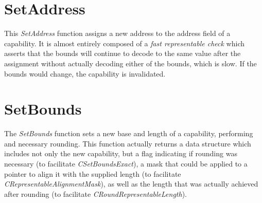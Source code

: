 

\section{SetAddress}
\label{sec:cheri-128-listings-setaddress}

This \emph{SetAddress} function assigns a new address to the address field
of a capability.
It is almost entirely composed of a \emph{fast representable check} which asserts
that the bounds will continue to decode to the same value after the assignment
without actually decoding either of the bounds, which is slow.
If the bounds would change, the capability is invalidated.



\section{SetBounds}
\label{sec:cheri-128-listings-setbounds}

The \emph{SetBounds} function sets a new base and length of a capability, performing
and necessary rounding.
This function actually returns a data structure which includes not only the new capability,
but a flag indicating if rounding was necessary (to facilitate \emph{CSetBoundsExact}),
a mask that could be applied to a pointer to align it with the supplied length (to facilitate \emph{CRepresentableAlignmentMask}),
as well as the length that was actually achieved after rounding (to facilitate \emph{CRoundRepresentableLength}).


